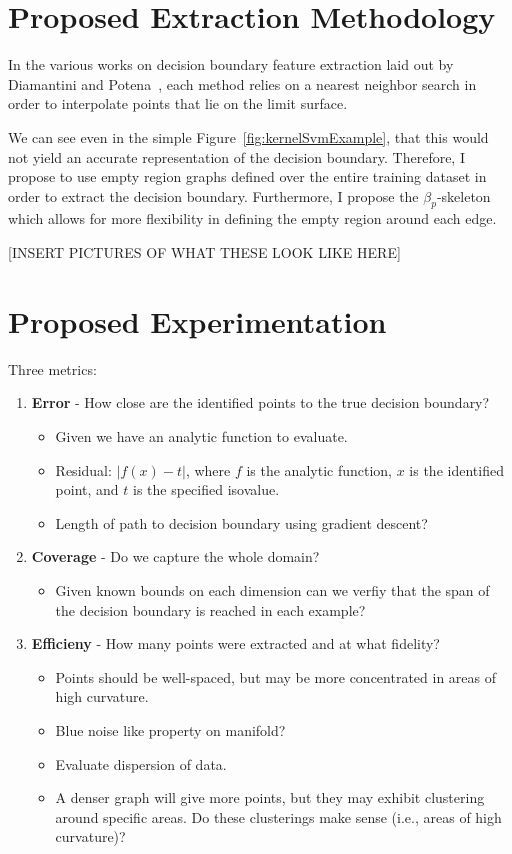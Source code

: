 \documentclass[12pt]{article}
\begin{document}
\section{Proposed Extraction Methodology}

In the various works on decision boundary feature extraction laid out by
Diamantini and Potena~\cite{DiamantiniPotena2007}, each method relies on a
nearest neighbor search in order to interpolate points that lie on the limit
surface.

We can see even in the simple Figure~\ref{fig:kernelSvmExample}, that this would
not yield an accurate representation of the decision boundary.
%
Therefore, I propose to use empty region graphs defined over the entire training
dataset in order to extract the decision boundary.
%
Furthermore, I propose the $\beta_p$-skeleton which allows for more flexibility
in defining the empty region around each edge.

[INSERT PICTURES OF WHAT THESE LOOK LIKE HERE]

\section{Proposed Experimentation}

Three metrics:
\begin{enumerate}
	\item \textbf{Error} - How close are the identified points to the true
	decision boundary? 
	\begin{itemize}
		\item Given we have an analytic function to evaluate.
		\item Residual: $|f(x)-t|$, where $f$ is the analytic function, $x$ is
		the identified point, and $t$ is the specified isovalue.
		\item Length of path to decision boundary using gradient descent?
	\end{itemize}
	\item \textbf{Coverage} - Do we capture the whole domain?
	\begin{itemize}
		\item Given known bounds on each dimension can we verfiy that the span
		of the decision boundary is reached in each example?
	\end{itemize}
	\item \textbf{Efficieny} - How many points were extracted and at what
	fidelity?
	\begin{itemize}
		\item Points should be well-spaced, but may be more concentrated in
		areas of high curvature.
		\item Blue noise like property on manifold?
		\item Evaluate dispersion of data.
		\item A denser graph will give more points, but they may exhibit clustering around specific areas. Do these clusterings make sense (i.e., areas of high curvature)?
	\end{itemize}
\end{enumerate}
\end{document}
